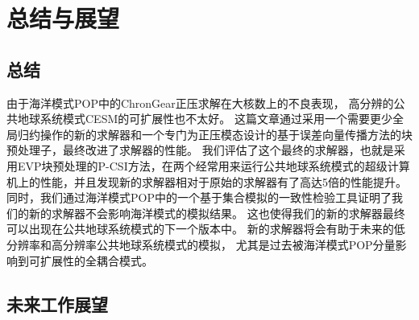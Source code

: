 \chapter{总结与展望}
\label{cha:conclusion}

\section{总结}
\label{sec:conclude}
由于海洋模式POP中的ChronGear正压求解在大核数上的不良表现， 高分辨的公共地球系统模式CESM的可扩展性也不太好。
这篇文章通过采用一个需要更少全局归约操作的新的求解器和一个专门为正压模态设计的基于误差向量传播方法的块预处理子，最终改进了求解器的性能。 
我们评估了这个最终的求解器，也就是采用EVP块预处理的P-CSI方法，在两个经常用来运行公共地球系统模式的超级计算机上的性能，并且发现新的求解器相对于原始的求解器有了高达5倍的性能提升。
同时，我们通过海洋模式POP中的一个基于集合模拟的一致性检验工具证明了我们的新的求解器不会影响海洋模式的模拟结果。 
这也使得我们的新的求解器最终可以出现在公共地球系统模式的下一个版本中。 
新的求解器将会有助于未来的低分辨率和高分辨率公共地球系统模式的模拟， 尤其是过去被海洋模式POP分量影响到可扩展性的全耦合模式。 
\section{未来工作展望}
\label{sec:futurework}
